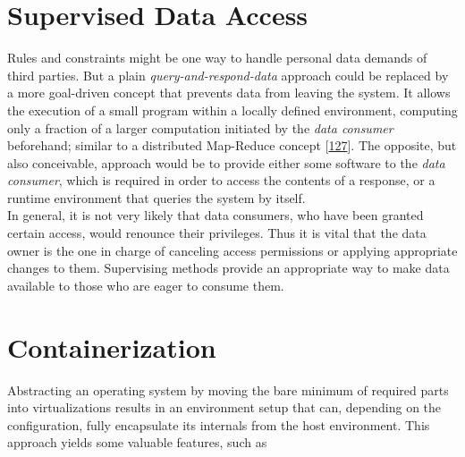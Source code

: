 \documentclass[12pt,english,a4paper,titlepage,cleardoublepage=empty,dottedtoc]{report}
\begin{document}
\hypertarget{supervised-data-access}{\section{Supervised Data
Access}\label{supervised-data-access}}

Rules and constraints might be one way to handle personal data demands
of third parties. But a plain \emph{query-and-respond-data} approach
could be replaced by a more goal-driven concept that prevents data from
leaving the system. It allows the execution of a small program within a
locally defined environment, computing only a fraction of a larger
computation initiated by the \emph{data consumer} beforehand; similar to
a distributed Map-Reduce concept
{[}\protect\hyperlink{ref-paper_2004_distributed-mapreduce}{127}{]}. The
opposite, but also conceivable, approach would be to provide either some
software to the \emph{data consumer}, which is required in order to
access the contents of a response, or a runtime environment that queries
the system by itself.\\
In general, it is not very likely that data consumers, who have been
granted certain access, would renounce their privileges. Thus it is
vital that the data owner is the one in charge of canceling access
permissions or applying appropriate changes to them. Supervising methods
provide an appropriate way to make data available to those who are eager
to consume them.

\section{Containerization}\label{containerization}

Abstracting an operating system by moving the bare minimum of required
parts into virtualizations results in an environment setup that can,
depending on the configuration, fully encapsulate its internals from the
host environment. This approach yields some valuable features, such as
\end{document}
